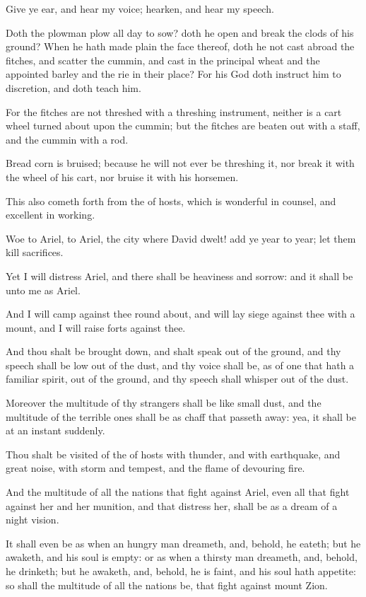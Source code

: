 \Verse Give ye ear, and hear my voice; hearken, and hear my speech.

\Verse Doth the plowman plow all day to sow? doth he open and break the clods of his ground?  \Verse When he hath made plain the face thereof, doth he not cast abroad the fitches, and scatter the cummin, and cast in the principal wheat and the appointed barley and the rie in their place?  \Verse For his God doth instruct him to discretion, and doth teach him.

\Verse For the fitches are not threshed with a threshing instrument, neither is a cart wheel turned about upon the cummin; but the fitches are beaten out with a staff, and the cummin with a rod.

\Verse Bread corn is bruised; because he will not ever be threshing it, nor break it with the wheel of his cart, nor bruise it with his horsemen.

\Verse This also cometh forth from the \LORD of hosts, which is wonderful in counsel, and excellent in working.


\Chapter
\Verse Woe to Ariel, to Ariel, the city where David dwelt! add ye year to year; let them kill sacrifices.

\Verse Yet I will distress Ariel, and there shall be heaviness and sorrow: and it shall be unto me as Ariel.

\Verse And I will camp against thee round about, and will lay siege against thee with a mount, and I will raise forts against thee.

\Verse And thou shalt be brought down, and shalt speak out of the ground, and thy speech shall be low out of the dust, and thy voice shall be, as of one that hath a familiar spirit, out of the ground, and thy speech shall whisper out of the dust.

\Verse Moreover the multitude of thy strangers shall be like small dust, and the multitude of the terrible ones shall be as chaff that passeth away: yea, it shall be at an instant suddenly.

\Verse Thou shalt be visited of the \LORD of hosts with thunder, and with earthquake, and great noise, with storm and tempest, and the flame of devouring fire.

\Verse And the multitude of all the nations that fight against Ariel, even all that fight against her and her munition, and that distress her, shall be as a dream of a night vision.

\Verse It shall even be as when an hungry man dreameth, and, behold, he eateth; but he awaketh, and his soul is empty: or as when a thirsty man dreameth, and, behold, he drinketh; but he awaketh, and, behold, he is faint, and his soul hath appetite: so shall the multitude of all the nations be, that fight against mount Zion.

